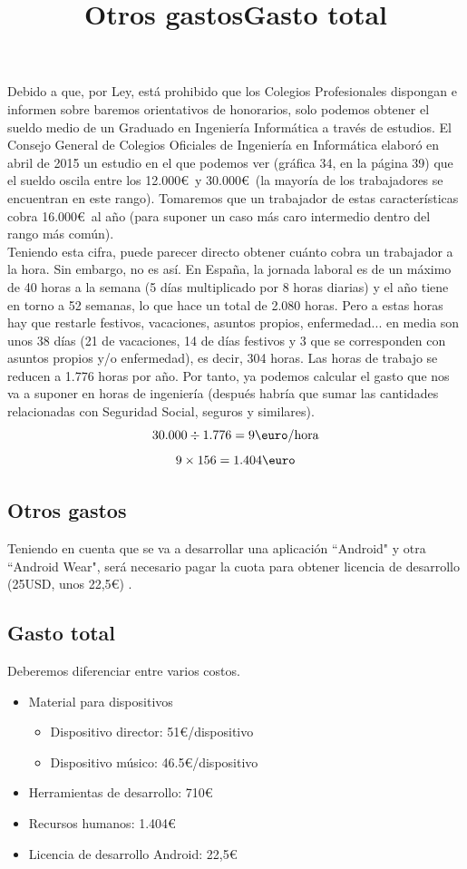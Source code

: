 Debido a que, por Ley, está prohibido que los Colegios Profesionales dispongan e informen
sobre baremos orientativos de honorarios, solo podemos obtener el sueldo medio de un Graduado
en Ingeniería Informática a través de estudios. El Consejo General de Colegios Oficiales de
Ingeniería en Informática elaboró en abril de 2015 un estudio \cite{estudioSalario} en el que
podemos ver (gráfica 34, en la página 39) que el sueldo oscila entre los 12.000\euro\ y
30.000\euro\ (la mayoría de los trabajadores se encuentran en este rango). Tomaremos que
un trabajador de estas características cobra 16.000\euro\ al año (para suponer un caso
más caro intermedio dentro del rango más común).\\

Teniendo esta cifra, puede parecer directo obtener cuánto cobra un trabajador a la hora. Sin
embargo, no es así. En España, la jornada laboral es de un máximo de 40 horas a la semana (5 días
multiplicado por 8 horas diarias) y el año tiene en torno a 52 semanas, lo que hace un total de 2.080 horas.
Pero a estas horas hay que restarle festivos, vacaciones, asuntos propios, enfermedad... en media
son unos 38 días (21 de vacaciones, 14 de días festivos y 3 que se corresponden con asuntos propios y/o
enfermedad), es decir, 304 horas. Las horas de trabajo se reducen a 1.776 horas por año. Por tanto, ya
podemos calcular el gasto que nos va a suponer en horas de ingeniería (después habría que sumar
las cantidades relacionadas con Seguridad Social, seguros y similares).\\


\[
  30.000 \div 1.776 = 9 \textup{\euro/hora}
\]
\[
  9 \times 156 = 1.404\textup{\euro}
\]

\subsection{Otros gastos}
\title{Otros gastos}
Teniendo en cuenta que se va a desarrollar una aplicación ``Android" y otra ``Android Wear",
será necesario pagar la cuota para obtener licencia de desarrollo (25USD, unos 22,5\euro) \cite{desarrollaAndroid}.\\


\subsection{Gasto total}
\title{Gasto total}
Deberemos diferenciar entre varios costos.

  \begin{itemize}
    \item Material para dispositivos
      \begin{itemize}
        \item Dispositivo director: 51\euro/dispositivo
        \item Dispositivo músico: 46.5\euro/dispositivo
      \end{itemize}
    \item Herramientas de desarrollo: 710\euro
    \item Recursos humanos: 1.404\euro
    \item Licencia de desarrollo Android: 22,5\euro
  \end{itemize}

